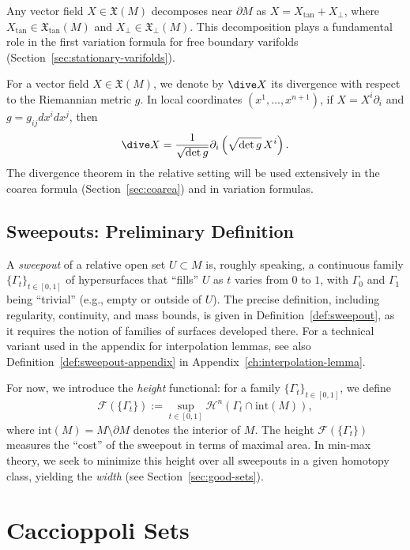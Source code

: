 Any vector field $X \in \mathfrak{X}(M)$ decomposes near $\partial M$ as $X = X_{\tan} + X_{\perp}$,
where $X_{\tan} \in \mathfrak{X}_{\tan}(M)$ and $X_{\perp} \in \mathfrak{X}_{\perp}(M)$. This
decomposition plays a fundamental role in the first variation formula for free boundary varifolds
(Section~\ref{sec:stationary-varifolds}).

For a vector field $X \in \mathfrak{X}(M)$, we denote by $\dive X$ its divergence with respect to the
Riemannian metric $g$. In local coordinates $(x^1, \ldots, x^{n+1})$, if $X = X^i \partial_i$ and
$g = g_{ij} dx^i dx^j$, then
\[
    \dive X = \frac{1}{\sqrt{\det g}} \partial_i\left( \sqrt{\det g} \, X^i \right).
\]
The divergence theorem in the relative setting will be used extensively in the coarea formula
(Section~\ref{sec:coarea}) and in variation formulas.

\subsection{Sweepouts: Preliminary Definition}\label{subsec:sweepouts-prelim}

A \emph{sweepout} of a relative open set $U \subset M$ is, roughly speaking, a continuous family
$\{\Gamma_t\}_{t \in [0,1]}$ of hypersurfaces that ``fills'' $U$ as $t$ varies from $0$ to $1$, with
$\Gamma_0$ and $\Gamma_1$ being ``trivial'' (e.g., empty or outside of $U$). The precise definition, including regularity, continuity, and mass bounds, is given in Definition~\ref{def:sweepout}, as it requires the notion of families of surfaces developed there.
For a technical variant used in the appendix for interpolation lemmas, see also
Definition~\ref{def:sweepout-appendix} in Appendix~\ref{ch:interpolation-lemma}.

For now, we introduce the \emph{height} functional: for a family $\{\Gamma_t\}_{t \in [0,1]}$, we define
\[
    \mathcal{F}(\{\Gamma_t\}) := \sup_{t \in [0,1]} \mathcal{H}^n(\Gamma_t \cap \mathrm{int}(M)),
\]
where $\mathrm{int}(M) = M \setminus \partial M$ denotes the interior of $M$. The height
$\mathcal{F}(\{\Gamma_t\})$ measures the ``cost'' of the sweepout in terms of maximal area. In min-max
theory, we seek to minimize this height over all sweepouts in a given homotopy class, yielding the
\emph{width} (see Section~\ref{sec:good-sets}).

\section{Caccioppoli Sets}\label{sec:caccioppoli}

